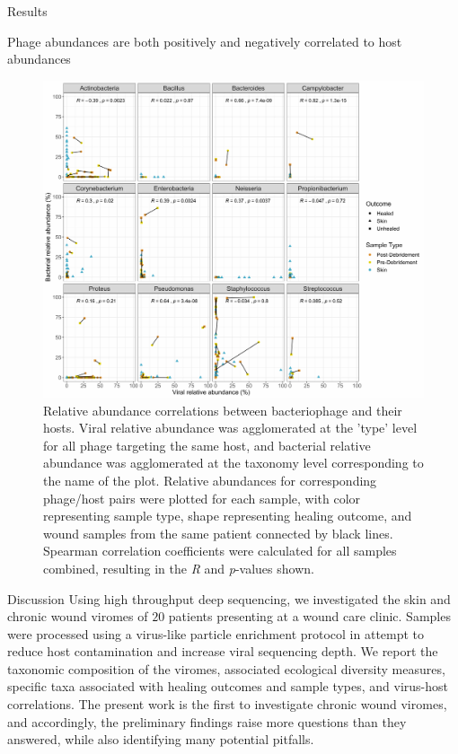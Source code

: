 \documentclass[oneside,12pt,final]{sty/ucthesis-CA2012}
\begin{document}
\begin{mainmatter}
\begin{section}{Results}
\begin{subsection}{Phage abundances are both positively and negatively correlated to host abundances}
\begin{figure}
\centering
\centerline{\includegraphics[width=\textwidth]{fig/C4fig7.pdf}}
\caption{Relative abundance correlations between bacteriophage and their hosts. Viral relative abundance was agglomerated at the 'type' level for all phage targeting the same host, and bacterial relative abundance was agglomerated at the taxonomy level corresponding to the name of the plot. Relative abundances for corresponding phage/host pairs were plotted for each sample, with color representing sample type, shape representing healing outcome, and wound samples from the same patient connected by black lines. Spearman correlation coefficients were calculated for all samples combined, resulting in the \textit{R} and \textit{p}-values shown.}
\label{fig:C4F7}
\end{figure}

\end{subsection}

\end{section}

\begin{section}{Discussion}
Using high throughput deep sequencing, we investigated the skin and chronic wound viromes of $20$ patients presenting at a wound care clinic. Samples were processed using a virus-like particle enrichment protocol in attempt to reduce host contamination and increase viral sequencing depth. We report the taxonomic composition of the viromes, associated ecological diversity measures, specific taxa associated with healing outcomes and sample types, and virus-host correlations. The present work is the first to investigate chronic wound viromes, and accordingly, the preliminary findings raise more questions than they answered, while also identifying many potential pitfalls.


\end{section}
\end{mainmatter}
\end{document}
